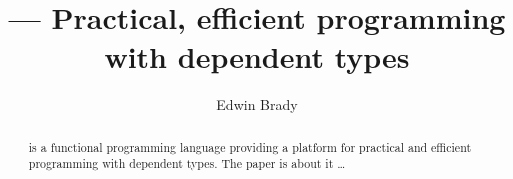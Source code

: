 \documentclass{llncs}
\begin{document}
\title{\Idris{} --- Practical, efficient programming with dependent types}
\author{Edwin Brady}

 
\maketitle

\begin{abstract}
\Idris{} is a functional programming language providing 
a platform for practical and efficient programming
with dependent types. The paper is about it \ldots


\end{abstract}







\newcommand{\Pair}{\TC{Pair}}
\newcommand{\MkPair}{\DC{MkPair}}






%

\end{document}
